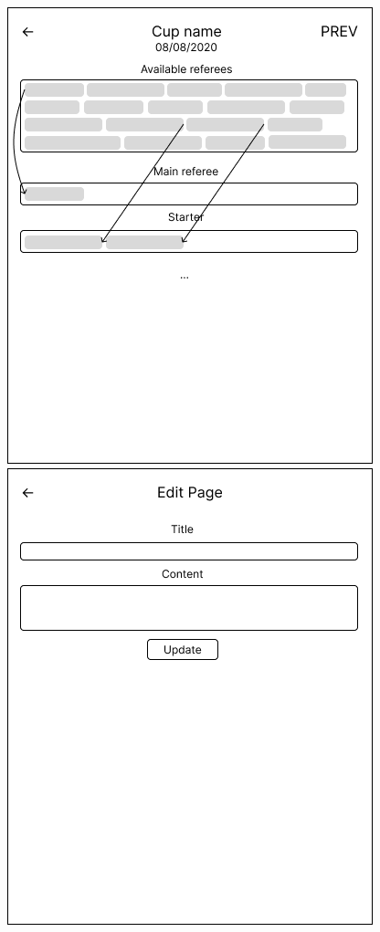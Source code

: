 \includegraphics[scale=0.507]{img/A-pairing.png}
\includegraphics[scale=0.507]{img/A-edit-page.png}
\newpage
